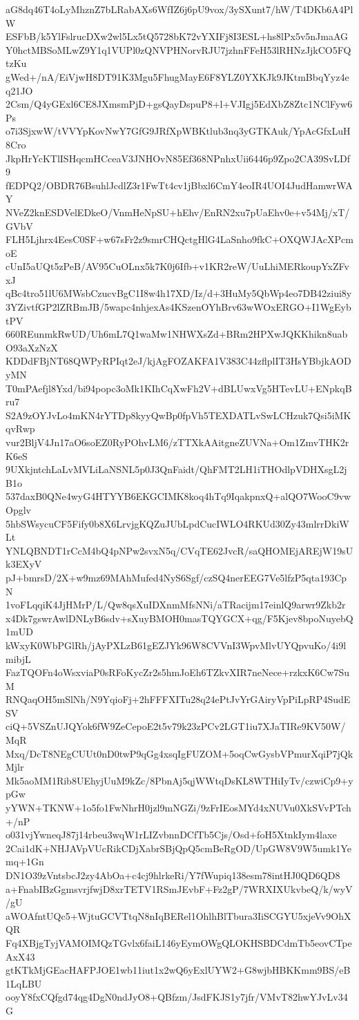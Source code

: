 aG8dq46T4oLyMhznZ7bLRabAXs6WfIZ6j6pU9vox/3ySXunt7/hW/T4DKb6A4PlW
ESFbB/k5YlFslrucDXw2wl5Lx5tQ5728bK72vYXIFj8I3ESL+hs8lPx5v5nJmaAG
Y0hctMBSoMLwZ9Y1q1VUPl0zQNVPHNorvRJU7jzhnFFeH53lRHNzJjkCO5FQtzKu
gWed+/nA/EiVjwH8DT91K3Mgu5FhugMayE6F8YLZ0YXKJk9JKtmBbqYyz4eq21JO
2Csm/Q4yGExl6CE8JXmsmPjD+gsQayDspuP8+l+VJIgj5EdXbZ8Ztc1NClFyw6Ps
o7i3SjxwW/tVVYpKovNwY7GfG9JRfXpWBKtlub3nq3yGTKAuk/YpAcGfxLuH8Cro
JkpHrYcKTlISHqcmHCceaV3JNHOvN85Ef368NPnhxUii6446p9Zpo2CA39SvLDf9
fEDPQ2/OBDR76BsuhlJcdlZ3r1FwTt4cv1jBbxl6CmY4eoIR4UOI4JudHamwrWAY
NVeZ2knESDVelEDkeO/VnmHeNpSU+hEhv/EnRN2xu7pUaEhv0e+v54Mj/xT/GVbV
FLH5Ljhrx4EesC0SF+w67sFr2z9smrCHQctgHlG4LaSnho9fkC+OXQWJAcXPcmoE
cUnI5aUQt5zPeB/AV95CuOLnx5k7K0j6Ifb+v1KR2reW/UuLhiMERkoupYxZFvxJ
qBc4tro51lU6MWsbCzucvBgC1I8w4h17XD/Iz/d+3HuMy5QbWp4eo7DB42ziui8y
3YZivtfGP2lZRBmJB/5wapc4nhjexAs4KSzenOYhBrv63wWOxERGO+I1WgEybtPV
660REunmkRwUD/Uh6mL7Q1waMw1NHWXsZd+BRm2HPXwJQKKhikn8uabO93aXzNzX
KDDdFBjNT68QWPyRPIqt2eJ/kjAgFOZAKFA1V383C44zflplIT3HsYBbjkAODyMN
T0mPAefjl8Yxd/bi94popc3oMk1KIhCqXwFh2V+dBLUwxVg5HTevLU+ENpkqBru7
S2A9zOYJvLo4mKN4rYTDp8kyyQwBp0fpVh5TEXDATLvSwLCHzuk7Qsi5iMKqvRwp
vur2BljV4Jn17aO6soEZ0RyPOhvLM6/zTTXkAAitgneZUVNa+Om1ZmvTHK2rK6eS
9UXkjntchLaLvMVLiLaNSNL5p0J3QnFaidt/QhFMT2LH1iTHOdlpVDHXsgL2jB1o
537daxB0QNe4wyG4HTYYB6EKGCIMK8koq4hTq9IqakpnxQ+alQO7WooC9vwOpglv
5hbSWsycuCF5Fify0b8X6LrvjgKQZuJUbLpdCucIWLO4RKUd30Zy43mlrrDkiWLt
YNLQBNDT1rCcM4bQ4pNPw2svxN5q/CVqTE62JvcR/saQHOMEjAREjW19sUk3EXyV
pJ+bmrsD/2X+w9mz69MAhMufed4NyS6Sgf/czSQ4nerEEG7Ve5lfzP5qta193CpN
1voFLqqiK4JjHMrP/L/Qw8qsXuIDXnmMfsNNi/aTRacijm17einlQ9arwr9Zkb2r
x4Dk7gswrAwlDNLyB6sdv+sXuyBMOH0masTQYGCX+qg/F5Kjev8bpoNuyebQ1mUD
kWxyK0WbPGlRh/jAyPXLzB61gEZJYk96W8CVVnI3WpvMlvUYQpvuKo/4i9lmibjL
FazTQOFn4oWsxviaP0sRFoKycZr2s5hmJoEh6TZkvXIR7neNece+rzkxK6Cw7SuM
RNQaqOH5mSlNh/N9YqioFj+2hFFFXITu28q24ePtJvYrGAiryVpPiLpRP4SudESV
ciQ+5VSZnUJQYok6fW9ZeCepoE2t5v79k23zPCv2LGT1iu7XJaTIRe9KV50W/MqR
Mxq/DcT8NEgCUUt0nD0twP9qGg4xsqIgFUZOM+5oqCwGysbVPmurXqiP7jQkMjlr
Mk5aoMM1Rib8UEhyjUuM9kZc/8PbnAj5qjWWtqDsKL8WTHiIyTv/czwiCp9+ypGw
yYWN+TKNW+1o5fo1FwNhrH0jzl9mNGZi/9zFrIEosMYd4xNUVu0XkSVvPTch+/nP
o031vjYwneqJ87j14rbeu3wqW1rLIZvbnnDCfTb5Cjs/Osd+foH5XtnkIym4laxe
2Cai1dK+NHJAVpVUcRikCDjXabrSBjQpQ5cmBeRgOD/UpGW8V9W5umk1Yemq+1Gn
DN1O39zVntsbcJ2zy4AbOa+c4cj9hlrkeRi/Y7fWupiq138esm78intHJ0QD6QD8
a+FnabIBzGgmsvrjfwjD8xrTETV1RSmJEvbF+Fz2gP/7WRXIXUkvbeQ/k/wyV/gU
aWOAfntUQc5+WjtuGCVTtqN8nIqBERel1OhlhBlTbura3IiSCGYU5xjeVv9OhXQR
Fq4XBjgTyjVAMOIMQzTGvlx6faiL146yEymOWgQLOKHSBDCdmTb5eovCTpeAxX43
gtKTkMjGEacHAFPJOE1wb11iut1x2wQ6yExlUYW2+G8wjbHBKKmm9BS/eB1LqLBU
ooyY8fxCQfgd74qg4DgN0ndJyO8+QBfzm/JsdFKJS1y7jfr/VMvT82hwYJvLv34G
